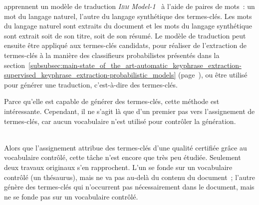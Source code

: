      apprennent un modèle de traduction
    \textit{\textsc{Ibm} Model-1}~\cite{brown1993ibmmodel1} à l'aide de paires
    de mots~: un mot du langage naturel, l'autre du langage synthétique des
    termes-clés. Les mots du langage naturel sont extraits du document et les
    mots du langage synthétique sont extrait soit de son titre, soit de son
    résumé. Le modèle de traduction peut ensuite être appliqué aux termes-clés
    candidats, pour réaliser de l'extraction de termes-clés à la manière des
    classifieurs probabilistes présentés dans la
    section~\ref{subsubsec:main-state_of_the_art-automatic_keyphrase_extraction-supervised_keyphrase_extraction-probabilistic_models}
    (page~\pageref{subsubsec:main-state_of_the_art-automatic_keyphrase_extraction-supervised_keyphrase_extraction-probabilistic_models}),
    ou être utilisé pour générer une traduction, c'est-à-dire des termes-clés.

    Parce qu'elle est capable de générer des termes-clés, cette méthode est
    intéressante. Cependant, il ne s'agit là que d'un premier pas vers
    l'assignement de termes-clés, car aucun vocabulaire n'est utilisé pour
    contrôler la génération.

    ~\\Alors que l'assignement attribue des termes-clés d'une qualité certifiée
    grâce au vocabulaire contrôlé, cette tâche n'est encore que très peu
    étudiée. Seulement deux travaux originaux s'en rapprochent. L'un se fonde
    sur un vocabulaire contrôlé (un thésaurus), mais ne va pas au-delà du
    contenu du document~; l'autre génère des termes-clés qui n'occurrent pas
    nécessairement dans le document, mais ne se fonde pas sur un vocabulaire
    contrôlé.


